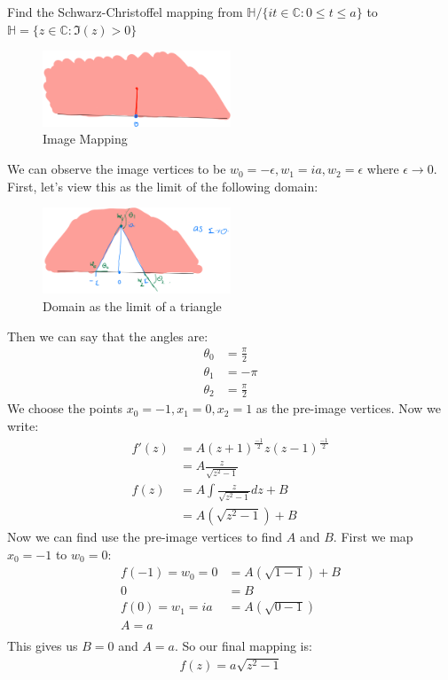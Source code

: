 \begin{example}
    Find the Schwarz-Christoffel mapping from $\mathbb{H}/\{it \in \mathbb{C} : 0 \leq t \leq a\}$ to $\mathbb{H} = \{z \in \mathbb{C} : \Im(z) > 0\}$
    \begin{figure}[H]
        \centering
        \includegraphics[width=0.5\textwidth]{LECTURE_18/graph4.png}
        \caption{Image Mapping}
    \end{figure}
    We can observe the image vertices to be $w_0 = -\epsilon, w_1 = ia, w_2 = \epsilon$ where $\epsilon \to 0$.
    First, let's view this as the limit of the following domain:
    \begin{figure}[H]
        \centering
        \includegraphics[width=0.5\textwidth]{LECTURE_18/graph5.png}
        \caption{Domain as the limit of a triangle}
    \end{figure}
    Then we can say that the angles are:
    \begin{align}
        \theta_0 & = \frac{\pi}{2} \\
        \theta_1 & = -\pi          \\
        \theta_2 & = \frac{\pi}{2}
    \end{align}
    We choose the points $x_0 = -1, x_1 = 0, x_2 = 1$ as the pre-image vertices. Now we write:
    \begin{align}
        f'(z) & = A (z + 1)^{\frac{-1}{2}}z(z - 1)^{\frac{-1}{2}} \\
              & = A \frac{z}{\sqrt{z^2 - 1}}                      \\
        f(z)  & = A \int \frac{z}{\sqrt{z^2 - 1}}dz + B           \\
              & = A(\sqrt{z^2 - 1}) + B
    \end{align}
    Now we can find use the pre-image vertices to find $A$ and $B$. First we map $x_0 = -1$ to $w_0 = 0$:
    \begin{align}
        f(-1) = w_0 = 0 & = A(\sqrt{1 - 1}) + B \\
        0               & = B                   \\
        f(0) = w_1 = ia & = A(\sqrt{0 - 1})     \\
        A = a                                   \\
    \end{align}
    This gives us $B = 0$ and $A = a$. So our final mapping is:
    \begin{align}
        f(z) = a\sqrt{z^2 - 1}
    \end{align}
\end{example}
